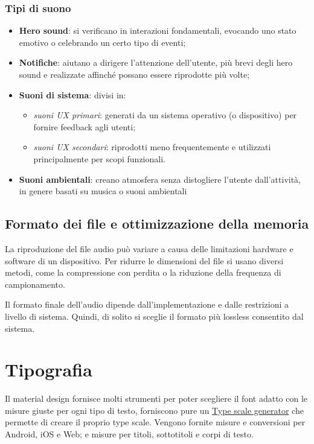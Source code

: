 \documentclass[12pt, a4paper]{report}
\begin{document}
              \subsubsection{Tipi di suono}
				\begin{itemize}
					\item \textbf{Hero sound}: si verificano in interazioni fondamentali, evocando uno stato emotivo o celebrando un certo tipo di eventi;
					\item \textbf{Notifiche}: aiutano a dirigere l'attenzione dell'utente, più brevi degli hero sound e realizzate affinché possano essere riprodotte più volte;
					\item \textbf{Suoni di sistema}: divisi in:
					\begin{itemize}
						\item \textit{suoni UX primari}: generati da un sistema operativo (o dispositivo) per fornire feedback agli utenti;
						\item \textit{suoni UX secondari}: riprodotti meno frequentemente e utilizzati principalmente per scopi	funzionali.
					\end{itemize}
					\item \textbf{Suoni ambientali}: creano atmosfera senza distogliere l'utente dall'attività, in genere basati su musica o suoni ambientali
				\end{itemize}

				\subsection{Formato dei file e ottimizzazione della memoria}
				La riproduzione del file audio può variare a causa delle limitazioni hardware e software di un dispositivo. Per ridurre le dimensioni del file si usano diversi metodi,
				come la compressione con perdita o la riduzione della frequenza di campionamento.

				Il formato finale dell'audio dipende dall'implementazione e dalle restrizioni a livello di sistema. Quindi, di solito si sceglie il formato più lossless consentito dal sistema.



	\section{Tipografia}
		Il material design fornisce molti strumenti per poter scegliere il font adatto con le misure giuste per ogni tipo di testo, forniscono pure un \href{https://material.io/design/typography/the-type-system.html#type-scale}{Type scale generator} che permette di creare il proprio type scale.
		Vengono fornite misure e conversioni per Android, iOS e Web; e misure per titoli, sottotitoli e corpi di testo.
\end{document}
